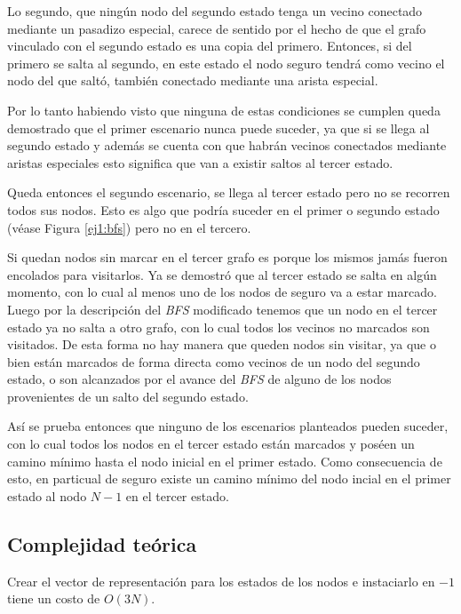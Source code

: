 	Lo segundo, que ningún nodo del segundo estado tenga un vecino conectado
	mediante un pasadizo especial, carece de sentido por el hecho de que el
	grafo vinculado con el segundo estado es una copia del primero. Entonces, si
	del primero se salta al segundo, en este estado el nodo seguro tendrá como
	vecino el nodo del que saltó, también conectado mediante una arista
	especial.

	Por lo tanto habiendo visto que ninguna de estas condiciones se cumplen
	queda demostrado que el primer escenario nunca puede suceder, ya que si se
	llega al segundo estado y además se cuenta con que habrán vecinos conectados
	mediante aristas especiales esto significa que van a existir saltos al
	tercer estado.

	Queda entonces el segundo escenario, se llega al tercer estado pero no se
	recorren todos sus nodos. Esto es algo que podría suceder en el primer o
	segundo estado (véase Figura \ref{ej1:bfs}) pero no en el tercero.

	Si quedan nodos sin marcar en el tercer grafo es porque los mismos jamás
	fueron encolados para visitarlos. Ya se demostró que al tercer estado se
	salta en algún momento, con lo cual al menos uno de los nodos de
	seguro va a estar marcado. Luego por la descripción del \emph{BFS}
	modificado tenemos que un nodo en el tercer estado ya no salta a otro grafo,
	con lo cual todos los vecinos no marcados son visitados. De esta forma no
	hay manera que queden nodos sin visitar, ya que o bien están marcados de
	forma directa como vecinos de un nodo del segundo estado, o son alcanzados por
	el avance del \emph{BFS} de alguno de los nodos provenientes de un salto del segundo estado.

	Así se prueba entonces que ninguno de los escenarios planteados pueden
	suceder, con lo cual todos los nodos en el tercer estado están marcados y
	poséen un camino mínimo hasta el nodo inicial en el primer estado. Como
	consecuencia de esto, en particual de seguro existe un camino mínimo del
	nodo incial en el primer estado al nodo $N - 1$ en el tercer estado.

    \subsection{Complejidad teórica}
    Crear el vector de representación para los estados de los nodos e instaciarlo en $-1$ tiene un costo de $O(3N)$.  

